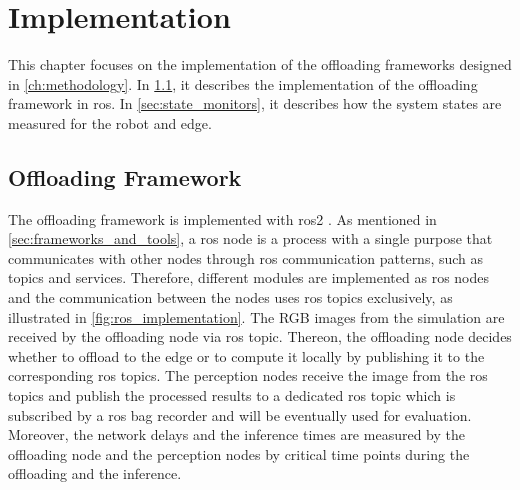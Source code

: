 \chapter{Implementation}\label{ch:implementation}

This chapter focuses on the implementation of the offloading frameworks designed in \cref{ch:methodology}. In \cref{sec:offloading_framework}, it describes the implementation of the offloading framework in \gls{ros}. In \cref{sec:state_monitors}, it describes how the system states are measured for the robot and edge. 

\section{Offloading Framework}\label{sec:offloading_framework}

The offloading framework is implemented with \gls{ros}2 \cite{Macenski2022}. As mentioned in \cref{sec:frameworks_and_tools}, a \gls{ros} node is a process with a single purpose that communicates with other nodes through \gls{ros} communication patterns, such as topics and services. Therefore, different modules are implemented as \gls{ros} nodes and the communication between the nodes uses \gls{ros} topics exclusively, as illustrated in \cref{fig:ros_implementation}. The RGB images from the simulation are received by the offloading node via \gls{ros} topic. Thereon, the offloading node decides whether to offload to the edge or to compute it locally by publishing it to the corresponding \gls{ros} topics. The perception nodes receive the image from the \gls{ros} topics and publish the processed results to a dedicated \gls{ros} topic which is subscribed by a \gls{ros} bag recorder and will be eventually used for evaluation. Moreover, the network delays and the inference times are measured by the offloading node and the perception nodes by critical time points during the offloading and the inference. 


